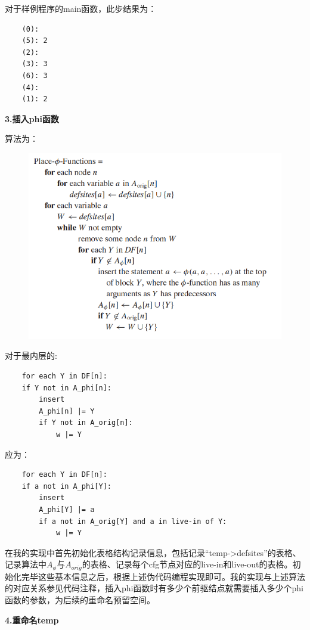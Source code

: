 \documentclass{article}
\begin{document}
对于样例程序的main函数，此步结果为：

\begin{lstlisting}
    (0):
    (5): 2
    (2):
    (3): 3
    (6): 3
    (4):
    (1): 2
\end{lstlisting}

\textbf{3.插入phi函数}

算法为：
\begin{figure}[h]
  \centering
  \includegraphics[width=.7\linewidth]{pics/phi.jpg}
  \label{fig:phi_theory}
\end{figure}

对于最内层的:

\begin{lstlisting}
    for each Y in DF[n]:
    if Y not in A_phi[n]:
        insert
        A_phi[n] |= Y
        if Y not in A_orig[n]:
            w |= Y
\end{lstlisting}

应为：

\begin{lstlisting}
    for each Y in DF[n]:
    if a not in A_phi[Y]:
        insert
        A_phi[Y] |= a
        if a not in A_orig[Y] and a in live-in of Y:
            w |= Y
\end{lstlisting}

在我的实现中首先初始化表格结构记录信息，包括记录“temp->defsites”的表格、记录算法中$A_{\phi}$与$A_{orig}$的表格、记录每个cfg节点对应的live-in和live-out的表格。初始化完毕这些基本信息之后，根据上述伪代码编程实现即可。我的实现与上述算法的对应关系参见代码注释，插入phi函数时有多少个前驱结点就需要插入多少个phi函数的参数，为后续的重命名预留空间。

\textbf{4.重命名temp}
\end{document}

